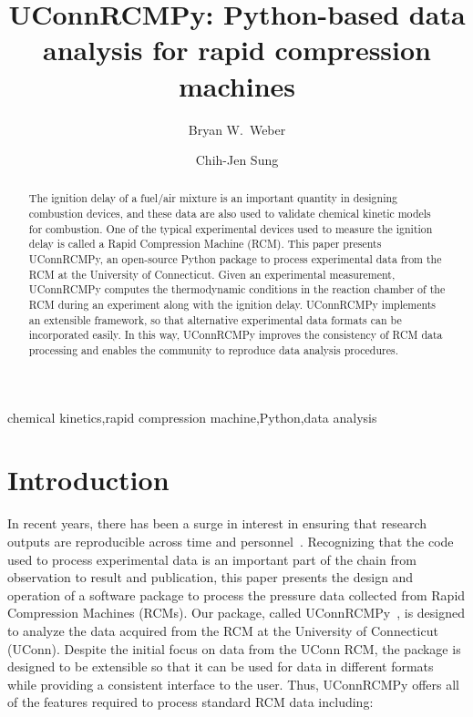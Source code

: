 \documentclass[12pt]{../ussci}
\title{ UConnRCMPy: Python-based data analysis for rapid compression machines }
\author[1*]{Bryan W.\ Weber}
\author[1]{Chih-Jen Sung}
\affil[1]{Department of Mechanical Engineering, University of Connecticut, Storrs,
CT, USA}
\affil[*]{Corresponding Author: \email{bryan.weber@uconn.edu}}
\begin{document}
\maketitle

\begin{abstract} %
    The ignition delay of a fuel/air mixture is an important quantity in
    designing combustion devices, and these data are also used to validate
    chemical kinetic models for combustion. One of the typical experimental
    devices used to measure the ignition delay is called a Rapid Compression
    Machine (RCM). This paper presents UConnRCMPy, an open-source Python package
    to process experimental data from the RCM at the University of Connecticut.
    Given an experimental measurement, UConnRCMPy computes the thermodynamic
    conditions in the reaction chamber of the RCM during an experiment along
    with the ignition delay. UConnRCMPy implements an extensible framework, so
    that alternative experimental data formats can be incorporated easily. In
    this way, UConnRCMPy improves the consistency of RCM data processing and
    enables the community to reproduce data analysis procedures.
\end{abstract}

\begin{keyword}
    chemical kinetics\sep rapid compression machine\sep Python\sep data analysis
\end{keyword}

\section{Introduction}\label{introduction}

In recent years, there has been a surge in interest in ensuring that research
outputs are reproducible across time and personnel~\autocite{NatureEds2016}.
Recognizing that the code used to process experimental data is an important part
of the chain from observation to result and publication, this paper presents the
design and operation of a software package to process the pressure data
collected from Rapid Compression Machines (RCMs). Our package, called
UConnRCMPy~\autocite{uconnrcmpy}, is designed to analyze the data acquired from
the RCM at the University of Connecticut (UConn). Despite the initial focus on
data from the UConn RCM, the package is designed to be extensible so that it can
be used for data in different formats while providing a consistent interface to
the user. Thus, UConnRCMPy offers all of the features required to process
standard RCM data including:
\end{document}
